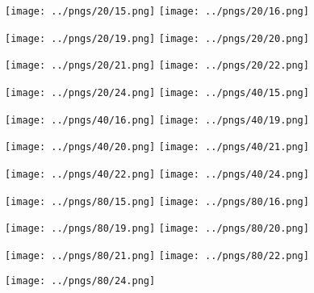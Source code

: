 \documentclass[12pt, a4paper]{article}
\begin{document}

\begin{figure}
\centering
\texttt{[image: ../pngs/20/15.png]} 
\texttt{[image: ../pngs/20/16.png]}
\end{figure}

\begin{figure}
\centering
\texttt{[image: ../pngs/20/19.png]} 
\texttt{[image: ../pngs/20/20.png]}
\end{figure}

\begin{figure}
\centering
\texttt{[image: ../pngs/20/21.png]} 
\texttt{[image: ../pngs/20/22.png]}
\end{figure}

\begin{figure}
\centering
\texttt{[image: ../pngs/20/24.png]} 
\texttt{[image: ../pngs/40/15.png]} 
\end{figure}

\begin{figure}
\centering
\texttt{[image: ../pngs/40/16.png]} 
\texttt{[image: ../pngs/40/19.png]} 
\end{figure}

\begin{figure}
\centering
\texttt{[image: ../pngs/40/20.png]} 
\texttt{[image: ../pngs/40/21.png]} 
\end{figure}

\begin{figure}
\centering
\texttt{[image: ../pngs/40/22.png]} 
\texttt{[image: ../pngs/40/24.png]} 
\end{figure}

\begin{figure}
\centering
\texttt{[image: ../pngs/80/15.png]} 
\texttt{[image: ../pngs/80/16.png]} 
\end{figure}

\begin{figure}
\centering
\texttt{[image: ../pngs/80/19.png]} 
\texttt{[image: ../pngs/80/20.png]} 
\end{figure}

\begin{figure}
\centering
\texttt{[image: ../pngs/80/21.png]} 
\texttt{[image: ../pngs/80/22.png]} 
\end{figure}

\begin{figure}
\centering
\texttt{[image: ../pngs/80/24.png]} 
\end{figure}



\end{document}
